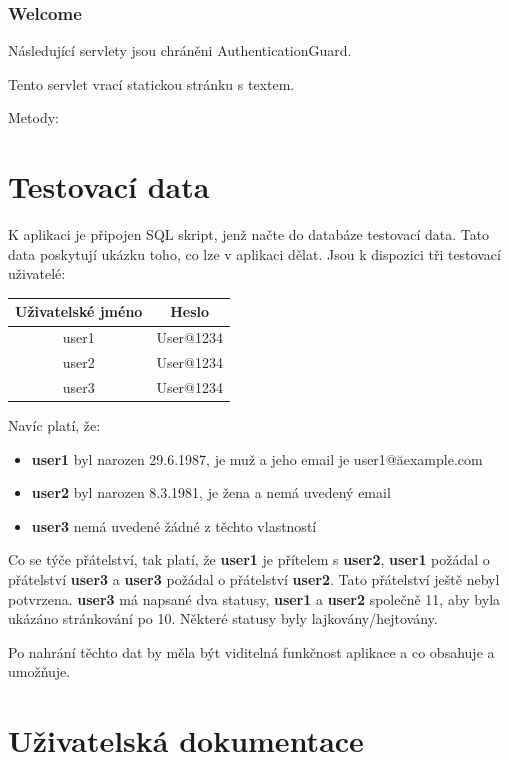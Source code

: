 \documentclass[
12pt,
a4paper,
pdftex,
czech,
titlepage
]{report}
\begin{document}
\subsection{Welcome}

Následující servlety jsou chráněni AuthenticationGuard.

Tento servlet vrací statickou stránku s textem.

Metody:
\begin{itemize}

\end{itemize}

\chapter{Testovací data}

K aplikaci je připojen SQL skript, jenž načte do databáze testovací data. Tato data poskytují ukázku toho, co lze v aplikaci dělat. Jsou k dispozici tři testovací uživatelé:

\begin{center}
\begin{tabular}{| c | c | }
\hline
	\textbf{Uživatelské jméno} & \textbf{Heslo} \\
	\hline
  user1 & User@1234  \\
  \hline
  user2 & User@1234  \\
  \hline
  user3 & User@1234  \\
  \hline
\end{tabular}
\end{center}

Navíc platí, že:
\begin{itemize}
\item \textbf{user1} byl narozen 29.6.1987, je muž a jeho email je user1@ăexample.com
\item \textbf{user2} byl narozen 8.3.1981, je žena a nemá uvedený email
\item \textbf{user3} nemá uvedené žádné z těchto vlastností
\end{itemize}

Co se týče přátelství, tak platí, že \textbf{user1} je přítelem s \textbf{user2}, \textbf{user1} požádal o přátelství \textbf{user3} a \textbf{user3} požádal o přátelství \textbf{user2}. Tato přátelství ještě nebyl potvrzena. \textbf{user3} má napsané dva statusy, \textbf{user1} a \textbf{user2} společně 11, aby byla ukázáno stránkování po 10. Některé statusy byly lajkovány/hejtovány.

Po nahrání těchto dat by měla být viditelná funkčnost aplikace a co obsahuje a umožňuje.

\chapter{Uživatelská dokumentace}
\end{document}
